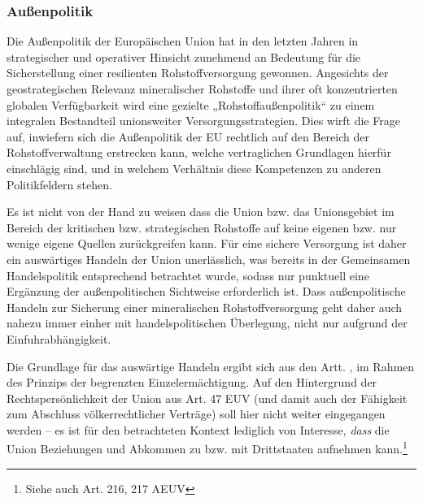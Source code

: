 \documentclass[12pt,a4paper,oneside]{book} %
\begin{document}
	
\subsubsection{Außenpolitik}
Die Außenpolitik der Europäischen Union hat in den letzten Jahren in strategischer und operativer Hinsicht zunehmend an Bedeutung für die Sicherstellung einer resilienten Rohstoffversorgung gewonnen. Angesichts der geostrategischen Relevanz mineralischer Rohstoffe und ihrer oft konzentrierten globalen Verfügbarkeit wird eine gezielte „Rohstoffaußenpolitik“ zu einem integralen Bestandteil unionsweiter Versorgungsstrategien. Dies wirft die Frage auf, inwiefern sich die Außenpolitik der EU rechtlich auf den Bereich der Rohstoffverwaltung erstrecken kann, welche vertraglichen Grundlagen hierfür einschlägig sind, und in welchem Verhältnis diese Kompetenzen zu anderen Politikfeldern stehen.

Es ist nicht von der Hand zu weisen dass die Union bzw. das Unionsgebiet im Bereich der kritischen bzw. strategischen Rohstoffe auf keine eigenen bzw. nur wenige eigene Quellen zurückgreifen kann. Für eine sichere Versorgung ist daher ein auswärtiges Handeln der Union unerlässlich, was bereits in der Gemeinsamen Handelspolitik entsprechend betrachtet wurde, sodass nur punktuell eine Ergänzung der außenpolitischen Sichtweise erforderlich ist. Dass außenpolitische Handeln zur Sicherung einer mineralischen Rohstoffversorgung geht daher auch nahezu immer einher mit handelspolitischen Überlegung, nicht nur aufgrund der Einfuhrabhängigkeit.

Die Grundlage für das auswärtige Handeln ergibt sich aus den Artt. , im Rahmen des Prinzips der begrenzten Einzelermächtigung. Auf den Hintergrund der Rechtspersönlichkeit der Union aus Art. 47 EUV (und damit auch der Fähigkeit zum Abschluss völkerrechtlicher Verträge) soll hier nicht weiter eingegangen werden -- es ist für den betrachteten Kontext lediglich von Interesse, \textit{dass} die Union Beziehungen und Abkommen zu bzw. mit Drittstaaten aufnehmen kann.\footnote{Siehe auch Art. 216, 217 AEUV}
\end{document}
